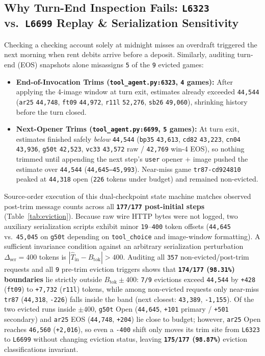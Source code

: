 \documentclass[10pt]{article}
\newcommand{\code}[1]{\texttt{#1}}
\begin{document}
\subsection{Why Turn-End Inspection Fails: \code{L6323} vs.\ \code{L6699} Replay \& Serialization Sensitivity}
Checking a checking account solely at midnight misses an overdraft triggered the next morning when rent debits arrive before a deposit. Similarly, auditing turn-end (EOS) snapshots alone misassigns \code{5} of the \code{9} evicted games:
\begin{itemize}[leftmargin=1.4em,itemsep=2pt]
\item \textbf{End-of-Invocation Trims (\code{tool\_agent.py:6323}, \code{4} games):} After applying the 4-image window at turn exit, estimates already exceeded \code{44,544} (\code{ar25} \code{44,748}, \code{ft09} \code{44,972}, \code{r11l} \code{52,276}, \code{sb26} \code{49,060}), shrinking history before the turn closed.
\item \textbf{Next-Opener Trims (\code{tool\_agent.py:6699}, \code{5} games):} At turn exit, estimates finished safely \emph{below} \code{44,544} (\code{bp35} \code{43,613}, \code{cd82} \code{43,223}, \code{cn04} \code{43,936}, \code{g50t} \code{42,523}, \code{vc33} \code{43,572} raw / \code{42,769} win-4 EOS), so nothing trimmed until appending the next step's \code{user} opener + image pushed the estimate over \code{44,544} (\code{44,645--45,993}). Near-miss game \code{tr87-cd924810} peaked at \code{44,318} open (\code{226} tokens under budget) and remained non-evicted.
\end{itemize}
Source-order execution of this dual-checkpoint state machine matches observed post-trim message counts across all \textbf{\code{177/177} post-initial steps} (Table~\ref{tab:eviction}). Because raw wire HTTP bytes were not logged, two auxiliary serialization scripts exhibit minor \code{19}--\code{400} token offsets (\code{44,645} vs.\ \code{45,045} on \code{g50t} depending on \code{tool\_choice} and image-window formatting). A sufficient invariance condition against an arbitrary serialization perturbation $\Delta_{\text{ser}} = 400$ tokens is $|\hat{T}_{\text{in}} - B_{\text{tok}}| > 400$. Auditing all \code{357} non-evicted/post-trim requests and all \code{9} pre-trim eviction triggers shows that \textbf{\code{174/177} (\code{98.31\%}) boundaries} lie strictly outside $B_{\text{tok}} \pm 400$: \code{7/9} evictions exceed \code{44,544} by \code{+428} (\code{ft09}) to \code{+7,732} (\code{r11l}) tokens, while among non-evicted requests only near-miss \code{tr87} (\code{44,318}, \code{-226}) falls inside the band (next closest: \code{43,389}, \code{-1,155}). Of the two evicted runs inside $\pm 400$, \code{g50t} Open (\code{44,645}, \code{+101} primary / \code{+501} secondary) and \code{ar25} EOS (\code{44,748}, \code{+204}) lie close to budget; however, \code{ar25} Open reaches \code{46,560} (\code{+2,016}), so even a \code{-400} shift only moves its trim site from \code{L6323} to \code{L6699} without changing eviction status, leaving \textbf{\code{175/177} (\code{98.87\%})} eviction classifications invariant.
\end{document}
